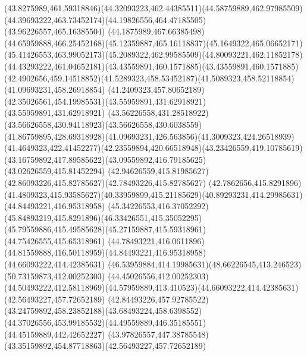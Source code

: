 {{		\curveto(43.8275989,461.59318846)(44.32093223,462.44385511)(44.58759889,462.97985509)
		\curveto(44.39693222,463.73452174)(44.19826556,464.47185505)(43.96226557,465.16385504)
		\lineto(44.1875989,467.66385498)
		\curveto(44.65959888,466.25452168)(45.12359887,465.16118837)(45.1649322,465.06652171)
		\curveto(45.41426553,463.99052173)(45.2089322,462.99585509)(44.80093221,462.11852178)
		\curveto(44.43293222,461.04652181)(43.43559891,460.1571885)(43.43559891,460.1571885)
		\curveto(42.4902656,459.14518852)(41.5289323,458.53452187)(41.5089323,458.52118854)
		\lineto(41.09693231,458.26918854)
		\lineto(41.2409323,457.80652189)
		\curveto(42.35026561,454.19985531)(43.55959891,431.62918921)(43.55959891,431.62918921)
		\curveto(43.56226558,431.28518922)(43.56626558,430.94118923)(43.56626558,430.6038559)
		\curveto(41.86759895,428.69318928)(41.09693231,426.563856)(41.3009323,424.26518939)
		\curveto(41.4649323,422.41452277)(42.23559894,420.66518948)(43.23426559,419.10785619)
		\curveto(43.16759892,417.89585622)(43.09559892,416.79185625)(43.02626559,415.81452294)
		\curveto(42.94626559,415.81985627)(42.86093226,415.82785627)(42.78493226,415.82785627)
		\lineto(42.7862656,415.8291896)
		\curveto(41.4809323,415.93585627)(40.33959899,415.21185629)(40.89293231,414.29985631)
		\moveto(44.84493221,416.95318958)
		\curveto(45.34226553,416.37052292)(45.84893219,415.8291896)(46.33426551,415.35052295)
		\curveto(45.79559886,415.49585628)(45.27159887,415.59318961)(44.75426555,415.65318961)
		\curveto(44.78493221,416.0611896)(44.81559888,416.50118959)(44.84493221,416.95318958)
		\moveto(44.66093222,414.42385631)
		\curveto(46.53959884,414.19985631)(48.66226545,413.246523)(50.73159873,412.00252303)
		\lineto(44.45026556,412.00252303)
		\curveto(44.50493222,412.58118969)(44.57959889,413.410523)(44.66093222,414.42385631)
		\moveto(42.56493227,457.72652189)
		\curveto(42.84493226,457.92785522)(43.24759892,458.23852188)(43.68493224,458.6398552)
		\curveto(44.37026556,453.99185532)(44.49559889,446.35185551)(44.45159889,442.42652227)
		\curveto(43.97826557,447.38785548)(43.35159892,454.87718863)(42.56493227,457.72652189)
	}
}
